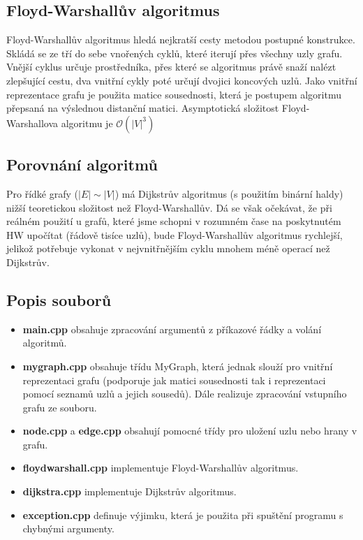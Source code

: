 \documentclass[a4paper,11pt]{article}
\begin{document}
\subsection{Floyd-Warshallův algoritmus}
Floyd-Warshallův algoritmus hledá nejkratší cesty metodou postupné konstrukce. Skládá se ze tří do sebe vnořených cyklů, které iterují přes všechny uzly grafu. Vnější cyklus určuje prostředníka, přes které se algoritmus právě snaží nalézt zlepšující cestu, dva vnitřní cykly poté určují dvojici koncových uzlů.
Jako vnitřní reprezentace grafu je použita matice sousednosti, která je postupem algoritmu přepsaná na výslednou distanční matici. Asymptotická složitost Floyd-Warshallova algoritmu je $\mathcal{O}(|V|^3)$

\subsection{Porovnání algoritmů}
Pro řídké grafy ($|E|\sim|V|$) má Dijkstrův algoritmus (s použitím binární haldy) nižší teoretickou složitost než Floyd-Warshallův. Dá se však očekávat, že při reálném použití u grafů, které jsme schopni v rozumném čase na poskytnutém HW upočítat (řádově tisíce uzlů), bude Floyd-Warshallův algoritmus rychlejší, jelikož potřebuje vykonat v nejvnitřnějším cyklu mnohem méně operací než Dijkstrův.

\subsection{Popis souborů}
\begin{itemize}
 \item \textbf{main.cpp} obsahuje zpracování argumentů z příkazové řádky a volání algoritmů.
 \item \textbf{mygraph.cpp} obsahuje třídu MyGraph, která jednak slouží pro vni\-třní reprezentaci grafu (podporuje jak matici sousednosti tak i reprezentaci pomocí seznamů uzlů a jejich sousedů). Dále realizuje zpracování vstupního grafu ze souboru.
 \item \textbf{node.cpp} a \textbf{edge.cpp} obsahují pomocné třídy pro uložení uzlu nebo hrany v grafu.
 \item \textbf{floydwarshall.cpp} implementuje Floyd-Warshallův algoritmus.
 \item \textbf{dijkstra.cpp} implementuje Dijkstrův algoritmus.
 \item \textbf{exception.cpp} definuje výjimku, která je použita při spuštění programu s chybnými argumenty.
\end{itemize}
\end{document}
